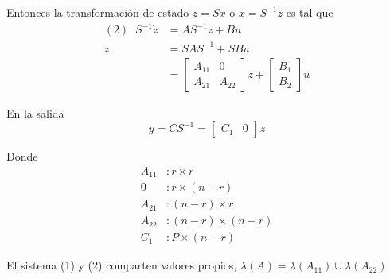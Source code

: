Entonces la transformación de estado \( z = Sx \) o \( x = S^{-1}z \) es tal que
\[
    \begin{split}
        (2) \;\; S^{-1}\dot{z} & = AS^{-1}z + Bu \\
        \dot{z} & =SAS^{-1} + SBu \\
        & = \begin{bmatrix}
                A_{11} & 0 \\
                A_{21} & A_{22}
            \end{bmatrix} z
            +
            \begin{bmatrix}
                B_{1} \\ B_{2}
            \end{bmatrix} u
    \end{split}
\]

En la salida
\[
    y = CS^{-1} = 
        \begin{bmatrix}
            C_{1} & 0    
        \end{bmatrix} z
\]

Donde 
\[
    \begin{split}
        A_{11} & : r \times r \\
        0 & : r \times (n-r) \\
        A_{21} & : (n-r) \times r \\
        A_{22} & : (n-r) \times (n-r) \\
        C_{1} & : P \times (n-r)
    \end{split} 
\]

El sistema (1) y (2) comparten valores propios, \( \lambda(A) = \lambda(A_{11}) \cup \lambda(A_{22}) \)

